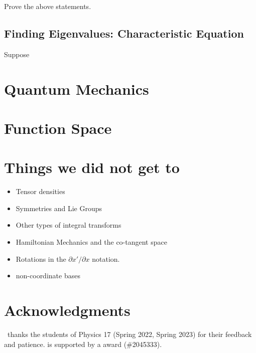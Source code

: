 \documentclass[12pt]{article}
\begin{document}
\begin{exercise}
Prove the above statements. 
\end{exercise}

\subsection{Finding Eigenvalues: Characteristic Equation}

Suppose 


\section{Quantum Mechanics}

\section{Function Space}




\appendix

\section{Things we did not get to}
\begin{itemize}
\item Tensor densities
\item Symmetries and Lie Groups
\item Other types of integral transforms
\item Hamiltonian Mechanics and the co-tangent space
\item Rotations in the $\partial x'/\partial x$ notation.
\item non-coordinate bases
\end{itemize}




\section*{Acknowledgments}

\ thanks the students of Physics 17 (Spring 2022, Spring 2023) for their feedback and patience.
%
 is supported by a  award (\#2045333).



% 
\end{document}
